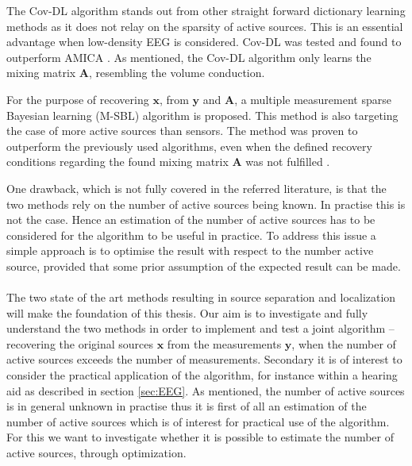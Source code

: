 The Cov-DL algorithm stands out from other straight forward dictionary learning methods as it does not relay on the sparsity of active sources. This is an essential advantage when low-density EEG is considered. 
Cov-DL was tested and found to outperform AMICA \cite{Balkan2015}.  
As mentioned, the Cov-DL algorithm only learns the mixing matrix $\mathbf{A}$, resembling the volume conduction.

For the purpose of recovering $\textbf{x}$, from $\textbf{y}$ and $\textbf{A}$, a multiple measurement sparse Bayesian learning (M-SBL) algorithm is proposed. This method is also targeting the case of more active sources than sensors.
The method was proven to outperform the previously used algorithms, even when the defined recovery conditions regarding the found mixing matrix $\textbf{A}$ was not fulfilled \cite{Balkan2014}.

One drawback, which is not fully covered in the referred literature, is that the two methods rely on the number of active sources being known. 
In practise this is not the case. 
Hence an estimation of the number of active sources has to be considered for the algorithm to be useful in practice. To address this issue a simple approach is to optimise the result with respect to the number active source, provided that some prior assumption of the expected result can be made.      
\\ \\
The two state of the art methods resulting in source separation and localization will make the foundation of this thesis. 
Our aim is to investigate and fully understand the two methods in order to implement and test a joint algorithm -- recovering the original sources $\textbf{x}$ from the measurements $\textbf{y}$, when the number of active sources exceeds the number of measurements. 
Secondary it is of interest to consider the practical application of the algorithm, for instance within a hearing aid as described in section \ref{sec:EEG}.  
As mentioned, the number of active sources is in general unknown in practise thus it is first of all an estimation of the number of active sources which is of interest for practical use of the algorithm. 
For this we want to investigate whether it is possible to estimate the number of active sources, through optimization.   
 


 
